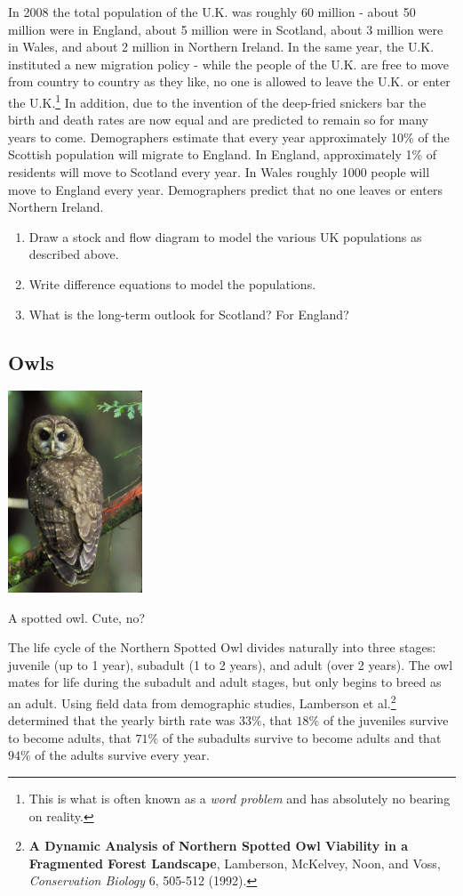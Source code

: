 In 2008 the total population of the U.K. was roughly 60 million - about 50 million were in England, about 5 million were in Scotland, about 3 million were in Wales, and about 2 million in Northern Ireland. In the same year, the U.K. instituted a new migration policy - while the people of the U.K. are free to move from country to country as they like, no one is allowed to leave the U.K. or enter the U.K.\footnote{This is what is often known as a {\em word problem} and has absolutely no bearing on reality.} In addition, due to the invention of the deep-fried snickers bar the birth and death rates are now equal and are predicted to remain so for many years to come. Demographers estimate that every year approximately 10\% of the Scottish population will migrate to England. In England, approximately 1\% of residents will move to Scotland every year. In Wales roughly 1000 people will move to England every year. Demographers predict that no one leaves or enters Northern Ireland. 
\begin{enumerate}
\item Draw a stock and flow diagram to model the various UK populations as described above.

\item Write difference equations to model the populations.

\item What is the long-term outlook for Scotland?  For England?
\end{enumerate}

\clearpage

\subsection{Owls}

\begin{marginfigure}
\includegraphics[width=4cm]{figs/owl}
\caption{A spotted owl.  Cute, no?}
\end{marginfigure}
The life cycle of the Northern Spotted Owl divides naturally into three stages: juvenile (up to 1 year), subadult (1 to 2 years), and adult (over 2 years). The owl mates for life during the subadult and adult stages, but only begins to breed as an adult. Using field data from demographic studies, Lamberson et al.\footnote{{\bf A Dynamic Analysis of Northern Spotted Owl Viability in a Fragmented Forest Landscape}, Lamberson, McKelvey, Noon, and Voss, {\em Conservation Biology} 6, 505-512 (1992).} determined that the yearly birth rate was $33\%$, that $18\%$ of the juveniles survive to become adults, that $71\%$ of the subadults survive to become adults and that $94 \%$ of the adults survive every year. 


